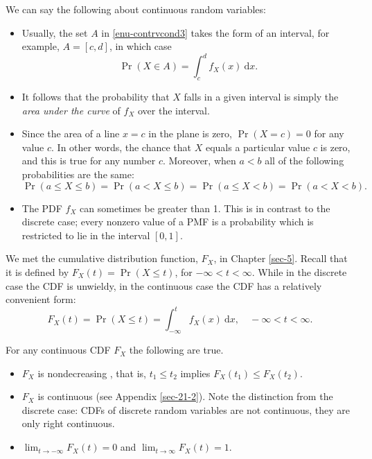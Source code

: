 \documentclass[captions=tableheading]{scrbook}
\begin{document}
\begin{rem}
We can say the following about continuous random variables:
\begin{itemize}
\item Usually, the set \(A\) in \ref{enu-contrvcond3} takes the form of an interval, for example, \(A=[c,d]\), in which case
  \begin{equation}
  \Pr(X\in A)=\int_{c}^{d}f_{X}(x)\:\mathrm{d} x.
  \end{equation}
\item It follows that the probability that \(X\) falls in a given interval is simply the \emph{area under the curve} of \(f_{X}\) over the interval.
\item Since the area of a line \(x=c\) in the plane is zero, \(\Pr(X=c)=0\)  for any value \(c\). In other words, the chance that \(X\) equals a particular value \(c\) is zero, and this is true for any number \(c\). Moreover, when \(a<b\) all of the following probabilities are the same:
  \begin{equation}
  \Pr(a\leq X\leq b)=\Pr(a<X\leq b)=\Pr(a\leq X<b)=\Pr(a<X<b).
  \end{equation}
\item The PDF \(f_{X}\) can sometimes be greater than 1. This is in contrast to the discrete case; every nonzero value of a PMF is a probability which is restricted to lie in the interval \([0,1]\).
\end{itemize}

\end{rem}

We met the cumulative distribution function, \(F_{X}\), in Chapter \ref{sec-5}. Recall that it is defined by \(F_{X}(t)=\Pr(X\leq t)\), for \(-\infty<t<\infty\). While in the discrete case the CDF is unwieldy, in the continuous case the CDF has a relatively convenient form:
\begin{equation}
F_{X}(t)=\Pr(X\leq t)=\int_{-\infty}^{t}f_{X}(x)\:\mathrm{d} x,\quad-\infty<t<\infty.
\end{equation}

\begin{rem}
For any continuous CDF \(F_{X}\) the following are true.
\begin{itemize}
\item \(F_{X}\) is nondecreasing , that is, \(t_{1}\leq t_{2}\) implies \(F_{X}(t_{1})\leq F_{X}(t_{2})\).
\item \(F_{X}\) is continuous (see Appendix \ref{sec-21-2}). Note the distinction from the discrete case: CDFs of discrete random variables are not continuous, they are only right continuous.
\item \(\lim_{t\to-\infty}F_{X}(t)=0\) and \(\lim_{t\to\infty}F_{X}(t)=1\).
\end{itemize}

\end{rem}
\end{document}

